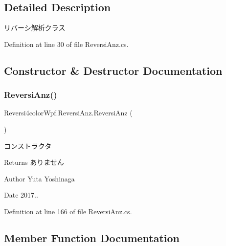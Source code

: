 \subsection{Detailed Description}
リバーシ解析クラス 

Definition at line 30 of file Reversi\+Anz.\+cs.



\subsection{Constructor \& Destructor Documentation}
\mbox{\label{class_reversi4color_wpf_1_1_reversi_anz_a9d030eb84ccce607874d2b23b127f086}} 
\subsubsection{\texorpdfstring{Reversi\+Anz()}{ReversiAnz()}}
{\footnotesize\ttfamily Reversi4color\+Wpf.\+Reversi\+Anz.\+Reversi\+Anz (\begin{DoxyParamCaption}{ }\end{DoxyParamCaption})}



コンストラクタ 

\begin{DoxyReturn}{Returns}
ありません 
\end{DoxyReturn}
\begin{DoxyAuthor}{Author}
Yuta Yoshinaga 
\end{DoxyAuthor}
\begin{DoxyDate}{Date}
2017.. 
\end{DoxyDate}


Definition at line 166 of file Reversi\+Anz.\+cs.



\subsection{Member Function Documentation}
\mbox{\label{class_reversi4color_wpf_1_1_reversi_anz_aa0841c9262eb94164e0e1428e1020b22}} 
